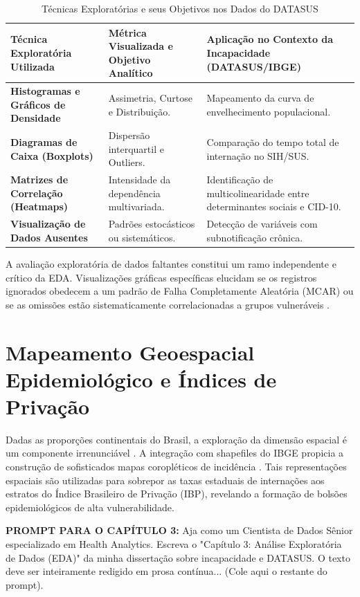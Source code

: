 \documentclass[12pt,openright,oneside,a4paper,brazil]{abntex2}
\begin{document}
\begin{table}[htb]
\centering
\caption{Técnicas Exploratórias e seus Objetivos nos Dados do DATASUS}
\label{tab:eda}
\begin{tabular}{|p{4cm}|p{5cm}|p{6cm}|}
\hline
\textbf{Técnica Exploratória Utilizada} & \textbf{Métrica Visualizada e Objetivo Analítico} & \textbf{Aplicação no Contexto da Incapacidade (DATASUS/IBGE)} \\ \hline
\textbf{Histogramas e Gráficos de Densidade} & Assimetria, Curtose e Distribuição. & Mapeamento da curva de envelhecimento populacional. \\ \hline
\textbf{Diagramas de Caixa (Boxplots)} & Dispersão interquartil e Outliers. & Comparação do tempo total de internação no SIH/SUS. \\ \hline
\textbf{Matrizes de Correlação (Heatmaps)} & Intensidade da dependência multivariada. & Identificação de multicolinearidade entre determinantes sociais e CID-10. \\ \hline
\textbf{Visualização de Dados Ausentes} & Padrões estocásticos ou sistemáticos. & Detecção de variáveis com subnotificação crônica. \\ \hline
\end{tabular}
\end{table}

A avaliação exploratória de dados faltantes constitui um ramo independente e crítico da EDA. Visualizações gráficas específicas elucidam se os registros ignorados obedecem a um padrão de Falha Completamente Aleatória (MCAR) ou se as omissões estão sistematicamente correlacionadas a grupos vulneráveis \cite{ref12}.

\section{Mapeamento Geoespacial Epidemiológico e Índices de Privação}
Dadas as proporções continentais do Brasil, a exploração da dimensão espacial é um componente irrenunciável \cite{ref31}. A integração com shapefiles do IBGE propicia a construção de sofisticados mapas coropléticos de incidência \cite{ref2, ref24}. Tais representações espaciais são utilizadas para sobrepor as taxas estaduais de internações aos estratos do Índice Brasileiro de Privação (IBP), revelando a formação de bolsões epidemiológicos de alta vulnerabilidade.

\begin{mdframed}[backgroundcolor=gray!10]
\textbf{PROMPT PARA O CAPÍTULO 3:} Aja como um Cientista de Dados Sênior especializado em Health Analytics. Escreva o "Capítulo 3: Análise Exploratória de Dados (EDA)" da minha dissertação sobre incapacidade e DATASUS. O texto deve ser inteiramente redigido em prosa contínua... (Cole aqui o restante do prompt).
\end{mdframed}
\end{document}
